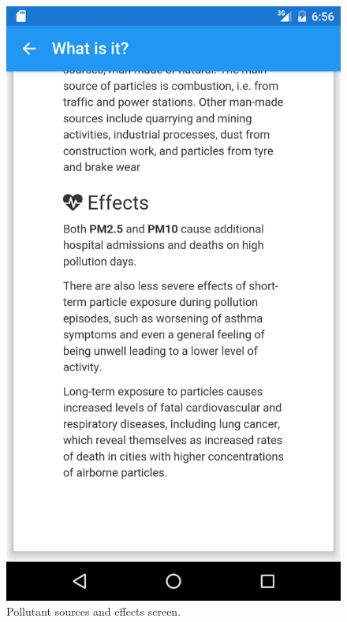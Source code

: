 \begin{figure}[H]
\begin{adjustbox}{width=.3\textwidth,center=\textwidth}
  \centering
  \includegraphics[scale=1]{images/second_visualization_sub_screen_2.png}
\end{adjustbox}
  \caption[Pollutant sources and effects screen]{Pollutant sources and effects screen.}
  \label{fig:second_visualization_sub_screen}
\end{figure}

